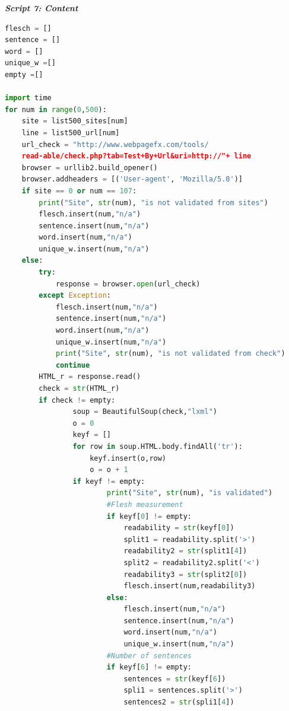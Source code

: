 \documentclass{book}
\begin{document}
\begin{center}
\textit{\textbf{Script 7: Content}}\label{p7}
\end{center}
\begin{lstlisting}[language=Python]
flesch = []
sentence = []
word = []
unique_w =[]
empty =[]

import time 
for num in range(0,500):
    site = list500_sites[num]
    line = list500_url[num] 
    url_check = "http://www.webpagefx.com/tools/
    read-able/check.php?tab=Test+By+Url&uri=http://"+ line
    browser = urllib2.build_opener()
    browser.addheaders = [('User-agent', 'Mozilla/5.0')]
    if site == 0 or num == 107:
        print("Site", str(num), "is not validated from sites")
        flesch.insert(num,"n/a")
        sentence.insert(num,"n/a")
        word.insert(num,"n/a")
        unique_w.insert(num,"n/a")  
    else:
        try:
            response = browser.open(url_check)
        except Exception: 
            flesch.insert(num,"n/a")
            sentence.insert(num,"n/a")
            word.insert(num,"n/a")
            unique_w.insert(num,"n/a")
            print("Site", str(num), "is not validated from check")
            continue        
        HTML_r = response.read()
        check = str(HTML_r)       
        if check != empty:                
                soup = BeautifulSoup(check,"lxml")
                o = 0
                keyf = []
                for row in soup.HTML.body.findAll('tr'):
                    keyf.insert(o,row)
                    o = o + 1
                if keyf != empty:                        
                        print("Site", str(num), "is validated")
                        #Flesh measurement
                        if keyf[0] != empty:
                            readability = str(keyf[0])
                            split1 = readability.split('>')
                            readability2 = str(split1[4])
                            split2 = readability2.split('<')
                            readability3 = str(split2[0])
                            flesch.insert(num,readability3)
                        else:
                            flesch.insert(num,"n/a")
                            sentence.insert(num,"n/a")
                            word.insert(num,"n/a")
                            unique_w.insert(num,"n/a")   
                        #Number of sentences   
                        if keyf[6] != empty:
                            sentences = str(keyf[6])
                            spli1 = sentences.split('>')
                            sentences2 = str(spli1[4])

\end{lstlisting}
\end{document}
